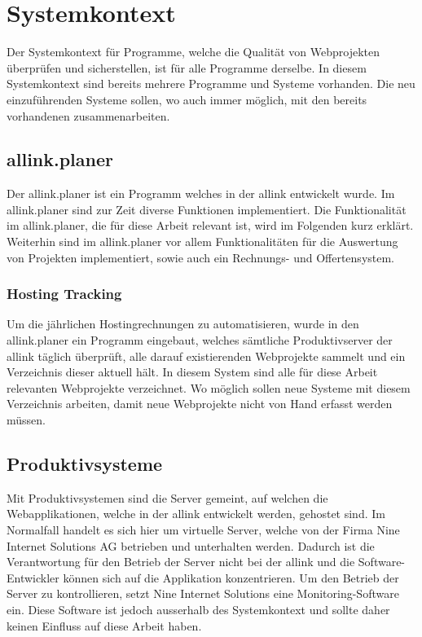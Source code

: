 
 \setcounter{anumber}{0}
\renewcommand\theanumber{A\arabic{anumber}}
\newcommand{\newanumber}[3]%
{%
\midrule%
\refstepcounter{anumber}\label{a:#1}%
\theanumber & #2 & #3 \\
}


\section{Systemkontext}
\label{sec:systemkontext}
Der Systemkontext für Programme, welche die Qualität von Webprojekten überprüfen und sicherstellen, ist für alle Programme derselbe. In diesem Systemkontext sind bereits mehrere Programme und Systeme vorhanden. Die neu einzuführenden Systeme sollen, wo auch immer möglich, mit den bereits vorhandenen zusammenarbeiten.

\subsection{allink.planer}
\label{sub:allink_planer}
Der allink.planer ist ein Programm welches in der allink entwickelt wurde. Im allink.planer sind zur Zeit diverse Funktionen implementiert. Die Funktionalität im allink.planer, die für diese Arbeit relevant ist, wird im Folgenden kurz erklärt. Weiterhin sind im allink.planer vor allem Funktionalitäten für die Auswertung von Projekten implementiert, sowie auch ein Rechnungs- und Offertensystem.

\subsubsection{Hosting Tracking}
\label{ssub:hosting_tracking}
Um die jährlichen Hostingrechnungen zu automatisieren, wurde in den allink.planer ein Programm eingebaut, welches sämtliche Produktivserver der allink täglich überprüft, alle darauf existierenden Webprojekte sammelt und ein Verzeichnis dieser aktuell hält. In diesem System sind alle für diese Arbeit relevanten Webprojekte verzeichnet. Wo möglich sollen neue Systeme mit diesem Verzeichnis arbeiten, damit neue Webprojekte nicht von Hand erfasst werden müssen.

\subsection{Produktivsysteme}
\label{sub:produktivsysteme}
Mit Produktivsystemen sind die Server gemeint, auf welchen die Webapplikationen, welche in der allink entwickelt werden, gehostet sind. Im Normalfall handelt es sich hier um virtuelle Server, welche von der Firma Nine Internet Solutions AG betrieben und unterhalten werden. Dadurch ist die Verantwortung für den Betrieb der Server nicht bei der allink und die Software-Entwickler können sich auf die Applikation konzentrieren. Um den Betrieb der Server zu kontrollieren, setzt Nine Internet Solutions eine Monitoring-Software ein. Diese Software ist jedoch ausserhalb des Systemkontext und sollte daher keinen Einfluss auf diese Arbeit haben.

